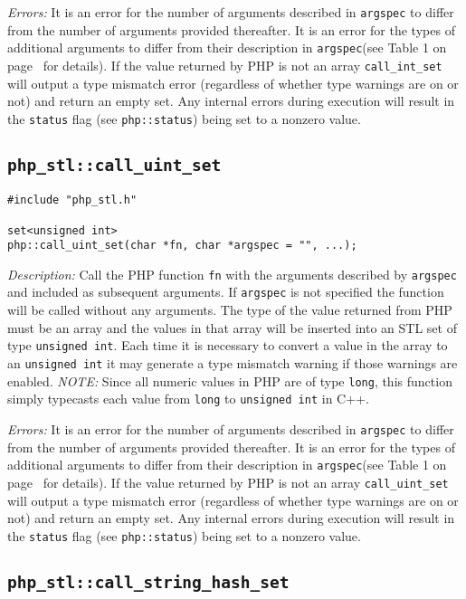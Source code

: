 \documentclass[11pt,titlepage]{article}
\begin{document}
\emph{Errors:} It is an error for the number of arguments described in \verb|argspec| to differ from the number of arguments provided thereafter. It is an error for the types of additional arguments to differ from their description in \verb|argspec|(see Table 1 on page~\pageref{Table1} for details). If the value returned by PHP is not an array \verb|call_int_set| will output a type mismatch error (regardless of whether type warnings are on or not) and return an empty set. Any internal errors during execution will result in the \verb|status| flag (see \verb|php::status|) being set to a nonzero value.


\subsection{\texttt{php\_stl::call\_uint\_set}}

\begin{verbatim}
#include "php_stl.h"

set<unsigned int> 
php::call_uint_set(char *fn, char *argspec = "", ...);
\end{verbatim}

\emph{Description:} Call the PHP function \verb|fn| with the arguments described by \verb|argspec| and included as subsequent arguments. If \verb|argspec| is not specified the function will be called without any arguments. The type of the value returned from PHP must be an array and the values in that array will be inserted into an STL set of type \verb|unsigned int|. Each time it is necessary to convert a value in the array to an \verb|unsigned int| it may generate a type mismatch warning if those warnings are enabled. \emph{NOTE:} Since all numeric values in PHP are of type \verb|long|, this function simply typecasts each value from \verb|long| to \verb|unsigned int| in C++.

\emph{Errors:} It is an error for the number of arguments described in \verb|argspec| to differ from the number of arguments provided thereafter. It is an error for the types of additional arguments to differ from their description in \verb|argspec|(see Table 1 on page~\pageref{Table1} for details). If the value returned by PHP is not an array \verb|call_uint_set| will output a type mismatch error (regardless of whether type warnings are on or not) and return an empty set. Any internal errors during execution will result in the \verb|status| flag (see \verb|php::status|) being set to a nonzero value.


\subsection{\texttt{php\_stl::call\_string\_hash\_set}}
\end{document}
